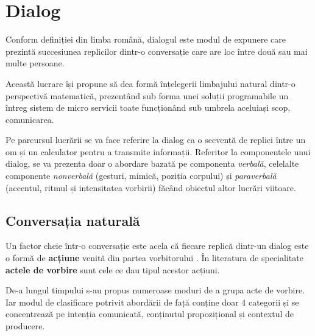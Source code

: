 \chapter{Dialog}

Conform definiției din limba română, dialogul este modul de expunere care prezintă succesiunea replicilor dintr-o conversație care are loc între două sau mai multe persoane.

Această lucrare își propune să dea formă înțelegerii limbajului natural dintr-o perspectivă matematică, prezentând sub forma unei soluții programabile un întreg sistem de micro servicii toate funcționând sub umbrela aceluiași scop, comunicarea.

Pe parcursul lucrării se va face referire la dialog ca o secvență de replici între un om și un calculator pentru a transmite informații.
Referitor la componentele unui dialog, se va prezenta doar o abordare bazată pe componenta \textit{verbală}, celelalte componente \textit{nonverbală} (gesturi, mimică, poziția corpului) și \textit{paraverbală} (accentul, ritmul și intensitatea vorbirii) făcând obiectul altor lucrări viitoare.


\section{Conversația naturală}

Un factor cheie într-o conversație este acela că fiecare replică dintr-un dialog este o formă de \textbf{acțiune} venită din partea vorbitorului \cite{witt1953}. În literatura de specialitate \textbf{actele de vorbire} sunt cele ce dau tipul acestor acțiuni.

De-a lungul timpului s-au propus numeroase moduri de a grupa acte de vorbire. Iar modul de clasificare potrivit abordării de față conține doar 4 categorii și se concentrează pe intenția comunicată, conținutul propozițional și contextul de producere.

